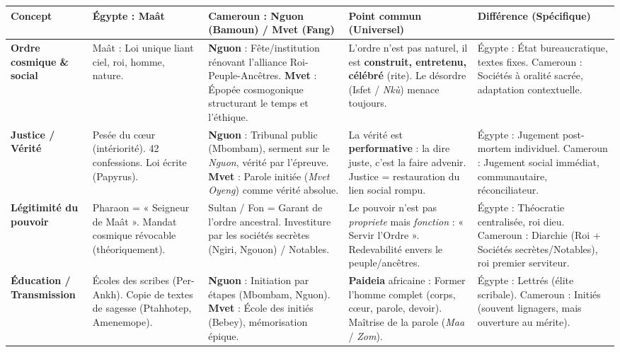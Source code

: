 \documentclass[11pt]{article}
\begin{document}
\begin{center}
\begin{tabularx}{\linewidth}{|l|X|X|X|X|}
\hline
\rowcolor{popblueL}
\textbf{Concept} & \textbf{Égypte : Maât} & \textbf{Cameroun : Nguon (Bamoun) / Mvet (Fang)} & \textbf{Point commun (Universel)} & \textbf{Différence (Spécifique)} \\
\hline
\textbf{Ordre cosmique \& social} & Maât : Loi unique liant ciel, roi, homme, nature. & \textbf{Nguon} : Fête/institution rénovant l'alliance Roi-Peuple-Ancêtres. \textbf{Mvet} : Épopée cosmogonique structurant le temps et l'éthique. & L'ordre n'est pas naturel, il est \textbf{construit, entretenu, célébré} (rite). Le désordre (Isfet / \textit{Nkù}) menace toujours. & Égypte : État bureaucratique, textes fixes. Cameroun : Sociétés à oralité sacrée, adaptation contextuelle. \\
\hline
\textbf{Justice / Vérité} & Pesée du cœur (intériorité). 42 confessions. Loi écrite (Papyrus). & \textbf{Nguon} : Tribunal public (Mbombam), serment sur le \textit{Nguon}, vérité par l'épreuve. \textbf{Mvet} : Parole initiée (\textit{Mvet Oyeng}) comme vérité absolue. & La vérité est \textbf{performative} : la dire juste, c'est la faire advenir. Justice = restauration du lien social rompu. & Égypte : Jugement post-mortem individuel. Cameroun : Jugement social immédiat, communautaire, réconciliateur. \\
\hline
\textbf{Légitimité du pouvoir} & Pharaon = « Seigneur de Maât ». Mandat cosmique révocable (théoriquement). & Sultan / Fon = Garant de l'ordre ancestral. Investiture par les sociétés secrètes (Ngiri, Ngouon) / Notables. & Le pouvoir n'est pas \emph{propriete} mais \emph{fonction} : « Servir l'Ordre ». Redevabilité envers le peuple/ancêtres. & Égypte : Théocratie centralisée, roi dieu. Cameroun : Diarchie (Roi + Sociétés secrètes/Notables), roi premier serviteur. \\
\hline
\textbf{Éducation / Transmission} & Écoles des scribes (Per-Ankh). Copie de textes de sagesse (Ptahhotep, Amenemope). & \textbf{Nguon} : Initiation par étapes (Mbombam, Nguon). \textbf{Mvet} : École des initiés (Bebey), mémorisation épique. & \textbf{Paideia} africaine : Former l'homme complet (corps, cœur, parole, devoir). Maîtrise de la parole (\textit{Maa} / \textit{Zom}). & Égypte : Lettrés (élite scribale). Cameroun : Initiés (souvent lignagers, mais ouverture au mérite). \\
\hline
\end{tabularx}
\end{center}
\end{document}
